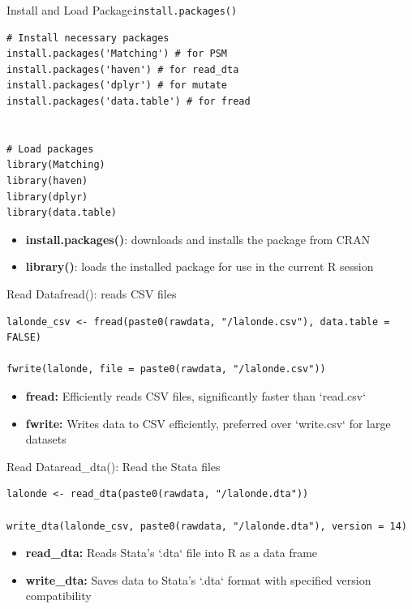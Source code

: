 \documentclass[dvipsnames,hyperref={pdfpagelabels=false}]{beamer}
\begin{document}
\begin{frame}[fragile]{Install and Load Package}{\texttt{install.packages()}}
\begin{lstlisting}
# Install necessary packages
install.packages('Matching') # for PSM
install.packages('haven') # for read_dta
install.packages('dplyr') # for mutate 
install.packages('data.table') # for fread


# Load packages
library(Matching) 
library(haven)
library(dplyr)
library(data.table)
\end{lstlisting}
	\begin{itemize}
		\vspace{0.2cm}
			\item \textbf{install.packages()}: downloads and installs the package from CRAN
			\vspace{0.2cm}
			\item \textbf{library()}: loads the installed package for use in the current R session
		\end{itemize}
\end{frame}


\begin{frame}[fragile]{Read Data}{fread(): reads CSV files}
\begin{lstlisting}
lalonde_csv <- fread(paste0(rawdata, "/lalonde.csv"), data.table = FALSE)

fwrite(lalonde, file = paste0(rawdata, "/lalonde.csv"))
\end{lstlisting}
	
	\begin{itemize}
		\vspace{0.2cm}
		\item \textbf{fread:} Efficiently reads CSV files, significantly faster than `read.csv`
		\vspace{0.2cm}
		\item \textbf{fwrite:} Writes data to CSV efficiently, preferred over `write.csv` for large datasets
	\end{itemize}
\end{frame}


\begin{frame}[fragile]{Read Data}{read\_dta(): Read the Stata files}
\begin{lstlisting}
lalonde <- read_dta(paste0(rawdata, "/lalonde.dta"))

write_dta(lalonde_csv, paste0(rawdata, "/lalonde.dta"), version = 14)
\end{lstlisting}
	
	\begin{itemize}
		\vspace{0.2cm}
			\item \textbf{read\_dta:} Reads Stata's `.dta` file into R as a data frame
					\vspace{0.2cm}
		\item \textbf{write\_dta:} Saves data to Stata's `.dta` format with specified version compatibility
		\vspace{0.2cm}
	\end{itemize}
\end{frame}
\end{document}
